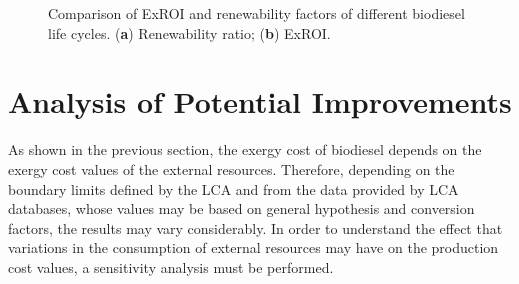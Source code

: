 \documentclass[sustainability,article,accept,moreauthors,pdftex,12pt,a4paper]{mdpi}
\begin{document}
\begin{figure}[H]
\centering
\small
{}
\hfill
{}
\caption{Comparison of ExROI and renewability factors of different biodiesel life cycles. (\textbf{a}) Renewability ratio; (\textbf{b}) ExROI.}
\label{fig3}
\end{figure}

\FloatBarrier
\break
\section{Analysis of Potential Improvements}

As shown in the previous section, the exergy cost of biodiesel depends on the exergy cost values of the external resources. Therefore, depending on the boundary limits defined by the LCA and from the data provided by LCA databases, whose values may be based on general hypothesis and conversion factors, the results may vary considerably. In order to understand the effect that variations in the consumption of external resources may have on the production cost values, a sensitivity analysis must be performed.
\end{document}
